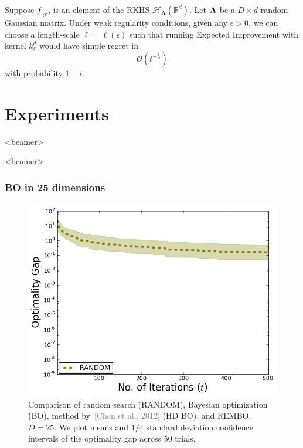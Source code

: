 \documentclass[grey]{beamer}
\begin{document}
  \begin{frame}
  \begin{theorem}\label{thm:regret}
   Suppose $f|_\mathcal T$, is an element of the RKHS 
   $\mathcal H_{\mathbf{\Lambda}}(\mathbb R^d)$.
   Let $\mathbf{A}$ be a $D \times d$ random Gaussian matrix. 
   Under weak regularity conditions, given any $\epsilon > 0$, we can choose a length-scale $\ell = \ell(\epsilon)$ such that running Expected Improvement with kernel $k_{\ell}^d$ would have simple regret in $$\mathcal O(t^{-\frac{1}{d}})$$ with probability $1-\epsilon$.
\end{theorem}

 \end{frame}
 
 

 \section{Experiments}
 \begin{frame}<beamer>
  \tableofcontents[currentsection]
 \end{frame}
 

 
 \begin{frame}<beamer>
  \frametitle{BO in 25 dimensions}
  
  \begin{figure}
   \includegraphics[width=0.6\columnwidth]{./figs/branin_dis1.png}
    \caption{Comparison of random search (RANDOM), Bayesian optimization (BO),
     method by~\textcolor{gray}{[Chen et al., 2012]} (HD BO), and REMBO.
     $D=25$. We plot means and $1/4$ 
     standard deviation confidence intervals of the optimality gap across 50 trials.}
   \label{fig:standard}
  \end{figure}
 \end{frame}
 
\end{document}
